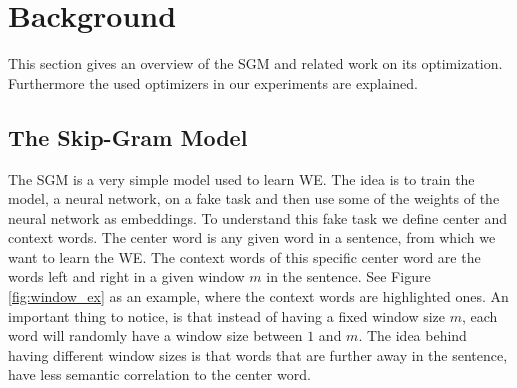 \chapter{Background}\label{chap:background}
This section gives an overview of the SGM and related work on its optimization. Furthermore the used optimizers in our experiments are explained.
\section{The Skip-Gram Model}
The SGM is a very simple model used to learn WE. The idea is to train the model, a neural network, on a fake task and then use some of the weights of the neural network as embeddings. To understand this fake task we define center and context words. The center word is any given word in a sentence, from which we want to learn the WE. The context words of this specific center word are the words left and right in a given window $m$ in the sentence. See Figure \ref{fig:window_ex} as an example, where the context words are highlighted ones. An important thing to notice, is that instead of having a fixed window size $m$, each word will randomly have a window size between $1$ and $m$. The idea behind having different window sizes is that words that are further away in the sentence, have less semantic correlation to the center word.

